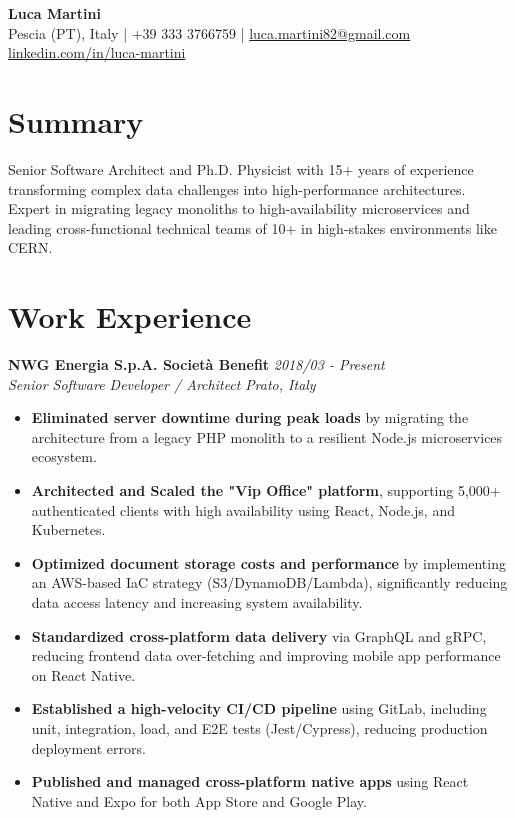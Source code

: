 \documentclass[11pt,a4paper]{article}
\begin{document}
\begin{center}
  {\huge \textbf{Luca Martini}} \\
  Pescia (PT), Italy | +39 333 3766759 | \href{mailto:luca.martini82@gmail.com}{luca.martini82@gmail.com} \\
  \href{https://www.linkedin.com/in/luca-martini}{linkedin.com/in/luca-martini}
\end{center}

\section{Summary}
Senior Software Architect and Ph.D. Physicist with 15+ years of experience transforming complex data challenges into high-performance architectures.
Expert in migrating legacy monoliths to high-availability microservices and leading cross-functional technical teams of 10+ in high-stakes environments like CERN.
\section{Work Experience}

\textbf{NWG Energia S.p.A. Società Benefit} \hfill \textit{2018/03 - Present} \\
\textit{Senior Software Developer / Architect} \hfill \textit{Prato, Italy}
\begin{itemize}[leftmargin=1.5em, itemsep=3pt, topsep=4pt]
  \item \textbf{Eliminated server downtime during peak loads} by migrating the architecture from a legacy PHP monolith to a resilient Node.js microservices ecosystem.
  \item \textbf{Architected and Scaled the "Vip Office" platform}, supporting 5,000+ authenticated clients with high availability using React, Node.js, and Kubernetes.
  \item \textbf{Optimized document storage costs and performance} by implementing an AWS-based IaC strategy (S3/DynamoDB/Lambda), significantly reducing data access latency and increasing system availability.
  \item \textbf{Standardized cross-platform data delivery} via GraphQL and gRPC, reducing frontend data over-fetching and improving mobile app performance on React Native.
  \item \textbf{Established a high-velocity CI/CD pipeline} using GitLab, including unit, integration, load, and E2E tests (Jest/Cypress), reducing production deployment errors.
  \item \textbf{Published and managed cross-platform native apps} using React Native and Expo for both App Store and Google Play.
\end{itemize}
\end{document}
